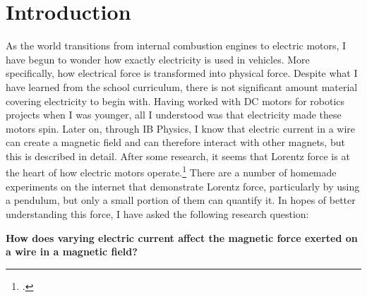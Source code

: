 \section*{Introduction}

As the world transitions from internal combustion engines to electric motors, I have begun to wonder how exactly electricity is used in vehicles.
More specifically, how electrical force is transformed into physical force.
Despite what I have learned from the school curriculum, there is not significant amount material covering electricity to begin with.
Having worked with DC motors for robotics projects when I was younger, all I understood was that electricity made these motors spin.
Later on, through IB Physics, I know that electric current in a wire can create a magnetic field and can therefore interact with other magnets, but this is described in detail.
After some research, it seems that Lorentz force is at the heart of how electric motors operate.\footcite{kramer2}
There are a number of homemade experiments on the internet that demonstrate Lorentz force, particularly by using a pendulum,
but only a small portion of them can quantify it.
In hopes of better understanding this force, I have asked the following research question:

\textbf{How does varying electric current affect the magnetic force exerted on a wire in a magnetic field?}
